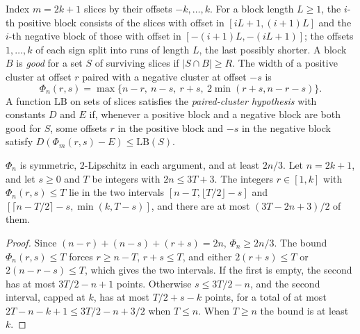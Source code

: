 \begin{definition}
  \label{def:frontiers-deletion-game}
  \leanok
  Index $m = 2k + 1$ slices by their offsets $-k, \dots, k$. For a block length $L \ge 1$,
  the $i$-th positive block consists of the slices with offset in $[iL + 1, (i + 1)L]$ and
  the $i$-th negative block of those with offset in $[-(i + 1)L, -(iL + 1)]$; the offsets
  $1, \dots, k$ of each sign split into runs of length $L$, the last possibly shorter. A
  block $B$ is \emph{good} for a set $S$ of surviving slices if $|S \cap B| \ge R$. The
  width of a positive cluster at offset $r$ paired with a negative cluster at offset $-s$
  is
  \[
    \Phi_n(r, s) = \max\{n - r,\ n - s,\ r + s,\ 2 \min(r + s, n - r - s)\}.
  \]
  A function $\mathrm{LB}$ on sets of slices satisfies the \emph{paired-cluster hypothesis}
  with constants $D$ and $E$ if, whenever a positive block and a negative block are both
  good for $S$, some offsets $r$ in the positive block and $-s$ in the negative block
  satisfy $D (\Phi_m(r, s) - E) \le \mathrm{LB}(S)$.
\end{definition}

\begin{lemma}
  \label{lem:frontiers-two-interval}
  \leanok
  $\Phi_n$ is symmetric, $2$-Lipschitz in each argument, and at least $2n/3$. Let
  $n = 2k + 1$, and let $s \ge 0$ and $T$ be integers with $2n \le 3T + 3$. The integers
  $r \in [1, k]$ with $\Phi_n(r, s) \le T$ lie in the two intervals
  $[n - T, \lfloor T/2 \rfloor - s]$ and $[\lceil n - T/2 \rceil - s, \min(k, T - s)]$, and
  there are at most $(3T - 2n + 3)/2$ of them.
\end{lemma}
\begin{proof}
  \leanok
  Since $(n - r) + (n - s) + (r + s) = 2n$, $\Phi_n \ge 2n/3$. The bound
  $\Phi_n(r, s) \le T$ forces $r \ge n - T$, $r + s \le T$, and either $2(r + s) \le T$ or
  $2(n - r - s) \le T$, which gives the two intervals. If the first is empty, the second
  has at most $3T/2 - n + 1$ points. Otherwise $s \le 3T/2 - n$, and the second interval,
  capped at $k$, has at most $T/2 + s - k$ points, for a total of at most
  $2T - n - k + 1 \le 3T/2 - n + 3/2$ when $T \le n$. When $T \ge n$ the bound is at least
  $k$.
\end{proof}

